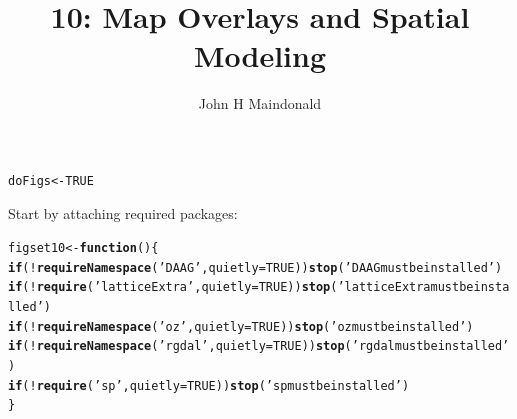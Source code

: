 \documentclass[12pt, a4paper,  BCOR=8.25mm, DIV=15]{scrartcl}\usepackage[]{graphicx}\usepackage[]{color}
\makeatletter
\newcommand{\hlnum}[1]{\textcolor[rgb]{0.686,0.059,0.569}{#1}}%
\newcommand{\hlstr}[1]{\textcolor[rgb]{0.192,0.494,0.8}{#1}}%
\newcommand{\hlopt}[1]{\textcolor[rgb]{0,0,0}{#1}}%
\newcommand{\hlstd}[1]{\textcolor[rgb]{0.345,0.345,0.345}{#1}}%
\newcommand{\hlkwa}[1]{\textcolor[rgb]{0.161,0.373,0.58}{\textbf{#1}}}%
\newcommand{\hlkwb}[1]{\textcolor[rgb]{0.69,0.353,0.396}{#1}}%
\newcommand{\hlkwc}[1]{\textcolor[rgb]{0.333,0.667,0.333}{#1}}%
\newcommand{\hlkwd}[1]{\textcolor[rgb]{0.737,0.353,0.396}{\textbf{#1}}}%
\newenvironment{kframe}{%
 \def\at@end@of@kframe{}%
 \ifinner\ifhmode%
  \def\at@end@of@kframe{\end{minipage}}%
  \begin{minipage}{\columnwidth}%
 \fi\fi%
 \def\FrameCommand##1{\hskip\@totalleftmargin \hskip-\fboxsep
 \colorbox{shadecolor}{##1}\hskip-\fboxsep
     \hskip-\linewidth \hskip-\@totalleftmargin \hskip\columnwidth}%
 \MakeFramed {\advance\hsize-\width
   \@totalleftmargin\z@ \linewidth\hsize
   \@setminipage}}%
 {\par\unskip\endMakeFramed%
 \at@end@of@kframe}
\newenvironment{knitrout}{}{} %
\makeatother
\begin{document}



\title{10: Map Overlays  and Spatial Modeling}
\author{John H Maindonald}
\maketitle

\vspace*{-0.5cm}
\begin{knitrout}
\color{fgcolor}\begin{kframe}
\begin{alltt}
\hlstd{doFigs} \hlkwb{<-} \hlnum{TRUE}
\end{alltt}
\end{kframe}
\end{knitrout}
\vspace*{-0.5cm}

Start by attaching required packages:

\begin{knitrout}
\color{fgcolor}\begin{kframe}
\begin{alltt}
\hlstd{figset10} \hlkwb{<-} \hlkwa{function}\hlstd{()\{}
  \hlkwa{if}\hlstd{(}\hlopt{!}\hlkwd{requireNamespace}\hlstd{(}\hlstr{'DAAG'}\hlstd{,} \hlkwc{quietly} \hlstd{=} \hlnum{TRUE}\hlstd{))}\hlkwd{stop}\hlstd{(}\hlstr{'DAAG must be installed'}\hlstd{)}
  \hlkwa{if}\hlstd{(}\hlopt{!}\hlkwd{require}\hlstd{(}\hlstr{'latticeExtra'}\hlstd{,} \hlkwc{quietly} \hlstd{=} \hlnum{TRUE}\hlstd{))}\hlkwd{stop}\hlstd{(}\hlstr{'latticeExtra must be installed'}\hlstd{)}
  \hlkwa{if}\hlstd{(}\hlopt{!}\hlkwd{requireNamespace}\hlstd{(}\hlstr{'oz'}\hlstd{,} \hlkwc{quietly} \hlstd{=} \hlnum{TRUE}\hlstd{))}\hlkwd{stop}\hlstd{(}\hlstr{'oz must be installed'}\hlstd{)}
  \hlkwa{if}\hlstd{(}\hlopt{!}\hlkwd{requireNamespace}\hlstd{(}\hlstr{'rgdal'}\hlstd{,} \hlkwc{quietly}\hlstd{=}\hlnum{TRUE}\hlstd{))}\hlkwd{stop}\hlstd{(}\hlstr{'rgdal must be installed'}\hlstd{)}
  \hlkwa{if}\hlstd{(}\hlopt{!}\hlkwd{require}\hlstd{(}\hlstr{'sp'}\hlstd{,} \hlkwc{quietly} \hlstd{=} \hlnum{TRUE}\hlstd{))}\hlkwd{stop}\hlstd{(}\hlstr{'sp must be installed'}\hlstd{)}
  \hlstd{\}}
\end{alltt}
\end{kframe}
\end{knitrout}
\end{document}
